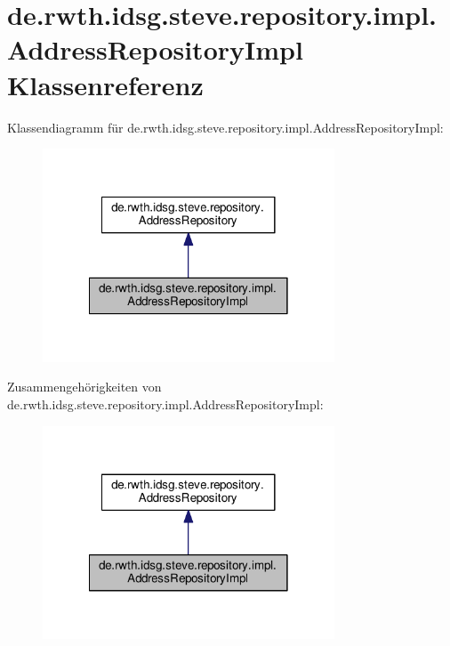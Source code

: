 \hypertarget{classde_1_1rwth_1_1idsg_1_1steve_1_1repository_1_1impl_1_1_address_repository_impl}{\section{de.\-rwth.\-idsg.\-steve.\-repository.\-impl.\-Address\-Repository\-Impl Klassenreferenz}
\label{classde_1_1rwth_1_1idsg_1_1steve_1_1repository_1_1impl_1_1_address_repository_impl}
}


Klassendiagramm für de.\-rwth.\-idsg.\-steve.\-repository.\-impl.\-Address\-Repository\-Impl\-:\nopagebreak
\begin{figure}[H]
\begin{center}
\leavevmode
\includegraphics[width=246pt]{classde_1_1rwth_1_1idsg_1_1steve_1_1repository_1_1impl_1_1_address_repository_impl__inherit__graph}
\end{center}
\end{figure}


Zusammengehörigkeiten von de.\-rwth.\-idsg.\-steve.\-repository.\-impl.\-Address\-Repository\-Impl\-:\nopagebreak
\begin{figure}[H]
\begin{center}
\leavevmode
\includegraphics[width=246pt]{classde_1_1rwth_1_1idsg_1_1steve_1_1repository_1_1impl_1_1_address_repository_impl__coll__graph}
\end{center}
\end{figure}

